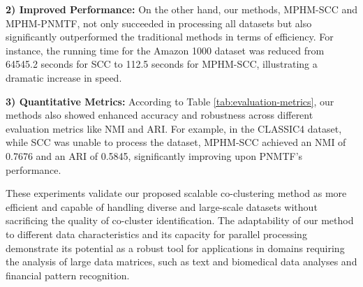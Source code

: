 \textbf{2) Improved Performance:} On the other hand, our methods, MPHM-SCC and MPHM-PNMTF, not only succeeded in processing all datasets but also significantly outperformed the traditional methods in terms of efficiency. For instance, the running time for the Amazon 1000 dataset was reduced from 64545.2 seconds for SCC to 112.5 seconds for MPHM-SCC, illustrating a dramatic increase in speed.

\textbf{3) Quantitative Metrics:} According to Table \ref{tab:evaluation-metrics}, our methods also showed enhanced accuracy and robustness across different evaluation metrics like NMI and ARI. For example, in the CLASSIC4 dataset, while SCC was unable to process the dataset, MPHM-SCC achieved an NMI of 0.7676 and an ARI of 0.5845, significantly improving upon PNMTF's performance.

These experiments validate our proposed scalable co-clustering method as more efficient and capable of handling diverse and large-scale datasets without sacrificing the quality of co-cluster identification. The adaptability of our method to different data characteristics and its capacity for parallel processing demonstrate its potential as a robust tool for applications in domains requiring the analysis of large data matrices, such as text and biomedical data analyses and financial pattern recognition.
